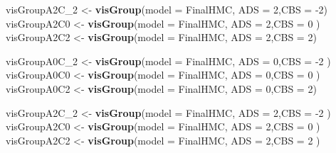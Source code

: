 \documentclass[10pt,dvipsnames,enabledeprecatedfontcommands]{scrartcl}
\newenvironment{Shaded}{\begin{snugshade}}{\end{snugshade}}
\newcommand{\KeywordTok}[1]{\textcolor[rgb]{0.13,0.29,0.53}{\textbf{#1}}}
\newcommand{\DataTypeTok}[1]{\textcolor[rgb]{0.13,0.29,0.53}{#1}}
\newcommand{\DecValTok}[1]{\textcolor[rgb]{0.00,0.00,0.81}{#1}}
\newcommand{\StringTok}[1]{\textcolor[rgb]{0.31,0.60,0.02}{#1}}
\newcommand{\NormalTok}[1]{#1}
\begin{document}
\begin{Shaded}
\begin{Highlighting}[]
\NormalTok{visGroupA2C_}\DecValTok{2}\NormalTok{ <-}\StringTok{ }\KeywordTok{visGroup}\NormalTok{(}\DataTypeTok{model =}\NormalTok{ FinalHMC, }\DataTypeTok{ADS =} \DecValTok{2}\NormalTok{,}\DataTypeTok{CBS =} \DecValTok{-2}\NormalTok{)}
\NormalTok{visGroupA2C0 <-}\StringTok{ }\KeywordTok{visGroup}\NormalTok{(}\DataTypeTok{model =}\NormalTok{ FinalHMC, }\DataTypeTok{ADS =} \DecValTok{2}\NormalTok{,}\DataTypeTok{CBS =} \DecValTok{0}\NormalTok{ )}
\NormalTok{visGroupA2C2 <-}\StringTok{ }\KeywordTok{visGroup}\NormalTok{(}\DataTypeTok{model =}\NormalTok{ FinalHMC, }\DataTypeTok{ADS =} \DecValTok{2}\NormalTok{,}\DataTypeTok{CBS =} \DecValTok{2}\NormalTok{)}

\NormalTok{visGroupA0C_}\DecValTok{2}\NormalTok{ <-}\StringTok{ }\KeywordTok{visGroup}\NormalTok{(}\DataTypeTok{model =}\NormalTok{ FinalHMC, }\DataTypeTok{ADS =} \DecValTok{0}\NormalTok{,}\DataTypeTok{CBS =} \DecValTok{-2}\NormalTok{ )}
\NormalTok{visGroupA0C0 <-}\StringTok{ }\KeywordTok{visGroup}\NormalTok{(}\DataTypeTok{model =}\NormalTok{ FinalHMC, }\DataTypeTok{ADS =} \DecValTok{0}\NormalTok{,}\DataTypeTok{CBS =} \DecValTok{0}\NormalTok{ )}
\NormalTok{visGroupA0C2 <-}\StringTok{  }\KeywordTok{visGroup}\NormalTok{(}\DataTypeTok{model =}\NormalTok{ FinalHMC, }\DataTypeTok{ADS =} \DecValTok{0}\NormalTok{,}\DataTypeTok{CBS =} \DecValTok{2}\NormalTok{)}

\NormalTok{visGroupA2C_}\DecValTok{2}\NormalTok{ <-}\StringTok{  }\KeywordTok{visGroup}\NormalTok{(}\DataTypeTok{model =}\NormalTok{ FinalHMC, }\DataTypeTok{ADS =} \DecValTok{2}\NormalTok{,}\DataTypeTok{CBS =} \DecValTok{-2}\NormalTok{ )}
\NormalTok{visGroupA2C0 <-}\StringTok{ }\KeywordTok{visGroup}\NormalTok{(}\DataTypeTok{model =}\NormalTok{ FinalHMC, }\DataTypeTok{ADS =} \DecValTok{2}\NormalTok{,}\DataTypeTok{CBS =} \DecValTok{0}\NormalTok{ )}
\NormalTok{visGroupA2C2 <-}\StringTok{ }\KeywordTok{visGroup}\NormalTok{(}\DataTypeTok{model =}\NormalTok{ FinalHMC, }\DataTypeTok{ADS =} \DecValTok{2}\NormalTok{,}\DataTypeTok{CBS =} \DecValTok{2}\NormalTok{ )}


\end{Highlighting}
\end{Shaded}
\end{document}
